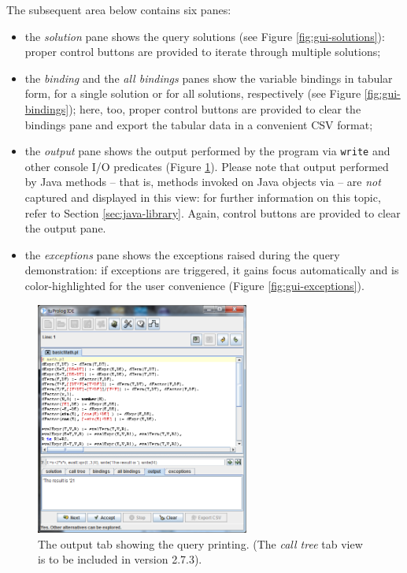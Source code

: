 The subsequent area below contains six panes:
%
\begin{itemize}
\item the \textit{solution} pane shows the query solutions (see Figure \ref{fig:gui-solutions}): proper control buttons are provided to iterate through multiple solutions;


\item the \textit{binding} and the \textit{all bindings} panes show the variable bindings in tabular form, for a single solution or for all solutions, respectively (see Figure \ref{fig:gui-bindings}); here, too, proper control buttons are provided to clear the bindings pane and export the tabular data in a convenient CSV format;

\item the \textit{output} pane shows the output performed by the program via \texttt{write} and other console I/O predicates (Figure \ref{fig:gui-output}).
    Please note that output performed by Java methods -- that is, methods invoked on Java objects via  -- are \textit{not} captured and displayed in this view: for further information on this topic, refer to Section \ref{sec:java-library}.
    Again, control buttons are provided to clear the output pane.

\item the \textit{exceptions} pane shows the exceptions raised during the query demonstration: if exceptions are triggered, it gains focus automatically and is color-highlighted for the user convenience (Figure \ref{fig:gui-exceptions}).
\end{itemize}


\begin{figure}
\centering
\includegraphics[width=7cm]{images/gui-output}
\caption{The output tab showing the query printing.
(The \textit{call tree} tab view is to be included in version 2.7.3).}
\label{fig:gui-output}
\end{figure}

